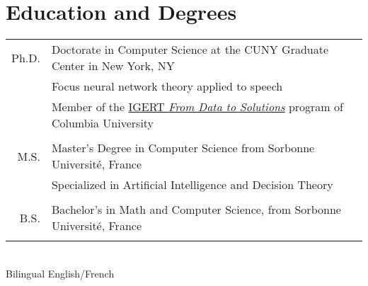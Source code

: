 \documentclass[a4paper,10pt]{article}
\begin{document}
\section{Education and Degrees}
    \vspace{0.2cm}
    \begin{tabular}{r|p{160mm}} 
        Ph.D. & Doctorate in Computer Science at the CUNY Graduate Center in New York, NY\\
        & \small{Focus neural network theory applied to speech}\\
        \hphantom{\textbf{Hunter}} & \small{Member of the \href{http://www.cs.columbia.edu/igert/people_students.shtml}{IGERT {\em From Data to Solutions}} program of Columbia University}\\
        \multicolumn{2}{c}{} \vspace{-1.5mm} \\

        M.S. & Master's Degree in Computer Science from Sorbonne Université, France \\
        & \small{Specialized in Artificial Intelligence and Decision Theory}\\
        \multicolumn{2}{c}{} \vspace{-1.5mm} \\
         
        B.S. & Bachelor's in Math and Computer Science, from Sorbonne Université, France \\ 
        \multicolumn{2}{c}{} \vspace{-1.5mm} \\
        
         
         

    \end{tabular}\\
\hphantom{........}\small{Bilingual English/French}\\
\end{document}
